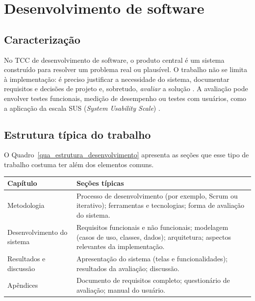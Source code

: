 \section{Desenvolvimento de software}
\label{sec_tipo_desenvolvimento}

\subsection{Caracterização}

No TCC de desenvolvimento de software, o produto central é um sistema construído para resolver um problema real ou plausível. O trabalho não se limita à implementação: é preciso justificar a necessidade do sistema, documentar requisitos e decisões de projeto e, sobretudo, \emph{avaliar} a solução \cite{sommerville2018engenharia,pressman2016engenharia}. A avaliação pode envolver testes funcionais, medição de desempenho ou testes com usuários, como a aplicação da escala SUS (\textit{System Usability Scale}) \cite{brooke1996sus}.

\subsection{Estrutura típica do trabalho}

O Quadro~\ref{qua_estrutura_desenvolvimento} apresenta as seções que esse tipo de trabalho costuma ter além dos elementos comuns.

\begin{quadro}[htb]
	\centering
	\caption{Estrutura típica de um TCC de desenvolvimento de software.}
	\label{qua_estrutura_desenvolvimento}
	\small
	\begin{tabularx}{\textwidth}{|l|X|}
		\hline
		\textbf{Capítulo} & \textbf{Seções típicas} \\ \hline
		Metodologia & Processo de desenvolvimento (por exemplo, Scrum ou iterativo); ferramentas e tecnologias; forma de avaliação do sistema. \\ \hline
		Desenvolvimento do sistema & Requisitos funcionais e não funcionais; modelagem (casos de uso, classes, dados); arquitetura; aspectos relevantes da implementação. \\ \hline
		Resultados e discussão & Apresentação do sistema (telas e funcionalidades); resultados da avaliação; discussão. \\ \hline
		Apêndices & Documento de requisitos completo; questionário de avaliação; manual do usuário. \\ \hline
	\end{tabularx}
\end{quadro}


